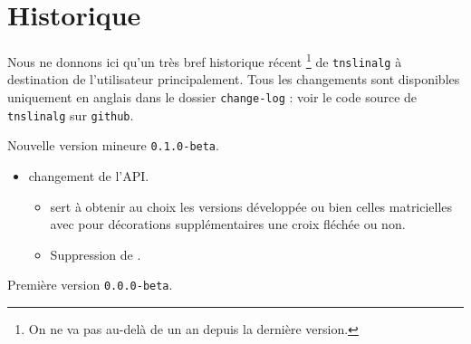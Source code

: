 \documentclass[12pt,a4paper]{article}
\begin{document}
\newpage

\section{Historique}

Nous ne donnons ici qu'un très bref historique récent
\footnote{
	On ne va pas au-delà de un an depuis la dernière version.
}
de \verb+tnslinalg+ à destination de l'utilisateur principalement.
Tous les changements sont disponibles uniquement en anglais dans le dossier \verb+change-log+ : voir le code source de \verb+tnslinalg+ sur \verb+github+.

\begin{description}

    \medskip
    \item[2020-08-27] Nouvelle version mineure \verb+0.1.0-beta+.
    
    \begin{itemize}[itemsep=.5em]
        \item {} changement de l'API.
        \begin{itemize}[itemsep=.5em]
            \item {} sert à obtenir au choix les versions développée ou bien celles matricielles avec pour décorations supplémentaires une croix fléchée ou non.
    
            \item Suppression de .
        \end{itemize}
    
    
    \end{itemize}
    
    \separation
    


    \medskip
    \item[2020-07-10] Première version \verb+0.0.0-beta+.

\end{description}
\end{document}
